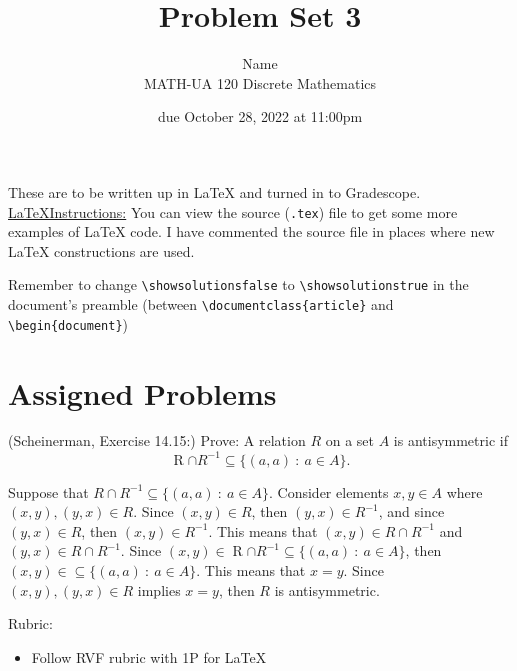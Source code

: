 \documentclass{article}
\title{Problem Set 3}
\author{%
    Name
\\  MATH-UA 120 Discrete Mathematics
}
\date{due October 28, 2022 at 11:00pm}
\newif\ifshowsolutions
\newcommand{\danger}{\marginpar[\hfill\dbend]{\dbend\hfill}}
\theoremstyle{definition}
\begin{document}
\maketitle



These are to be written up in \LaTeX{} and turned in to Gradescope.\\



\ifshowsolutions
    \SetupExSheets{solution/print=true}
\else
    \danger
 \underline{ \LaTeX  Instructions:}  You can view the source (\texttt{.tex}) file to get some more examples of \LaTeX{} code.  I have commented the source file in places where new \LaTeX{} constructions are used.
  
  Remember to change \verb|\showsolutionsfalse| to \verb|\showsolutionstrue|
    in the document's preamble 
    (between \verb|\documentclass{article}| and \verb|\begin{document}|)
\fi

\section*{Assigned Problems}

\begin{question}
    (Scheinerman, Exercise 14.15:)
    Prove: A relation $R$ on a set $A$ is antisymmetric if 
    \[\mathrel{R}\cap R^{-1} \subseteq \{ (a, a) ~:~ a \in A \}. \]
\end{question}
\begin{solution}
Suppose that $R \cap R^{-1} \subseteq \{ (a, a) ~:~ a \in A \}$. Consider elements $x, y\in A$ where $(x, y), (y, x) \in R$. Since $(x, y) \in R$, then $(y, x) \in R^{-1}$, and since $(y, x) \in R$, then $(x, y) \in R^{-1}$. This means that $(x, y) \in R\cap R^{-1}$ and $(y, x) \in R\cap R^{-1}$. Since $(x, y) \in\mathrel{R}\cap R^{-1}\subseteq \{ (a, a) ~:~ a \in A \}$, then $(x, y) \in \subseteq \{ (a, a) ~:~ a \in A \}$.  This means that $x = y$. Since $(x, y), (y, x) \in R$ implies $x= y$, then $R$ is antisymmetric.

{\color{red} Rubric:
\begin{itemize}
\item Follow RVF rubric with 1P for \LaTeX
\end{itemize}}
\end{solution}
\end{document}
